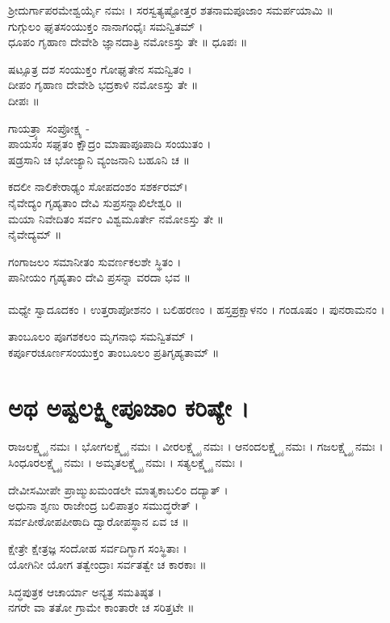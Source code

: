  ಶ್ರೀದುರ್ಗಾಪರಮೇಶ್ವರ್ಯೈ ನಮಃ ।  ಸರಸ್ವತ್ಯಷ್ಟೋತ್ತರ ಶತನಾಮಪೂಜಾಂ ಸಮರ್ಪಯಾಮಿ ॥\\

ಗುಗ್ಗುಲಂ ಘೃತಸಂಯುಕ್ತಂ ನಾನಾಗಂಧೈಃ ಸಮನ್ವಿತಮ್ ।\\
ಧೂಪಂ ಗೃಹಾಣ ದೇವೇಶಿ ಜ್ಞಾನದಾತ್ರಿ ನಮೋಽಸ್ತು ತೇ ॥
 ಧೂಪಃ ॥

ಷಟ್ಸೂತ್ರ ದಶ ಸಂಯುಕ್ತಂ ಗೋಘೃತೇನ ಸಮನ್ವಿತಂ ।\\
ದೀಪಂ ಗೃಹಾಣ ದೇವೇಶಿ ಭದ್ರಕಾಳಿ ನಮೋಽಸ್ತು ತೇ ॥\\
ದೀಪಃ ॥

ಗಾಯತ್ರ್ಯಾ ಸಂಪ್ರೋಕ್ಷ್ಯ -\\
ಪಾಯಸಂ ಸಘೃತಂ ಕ್ಷೌದ್ರಂ ಮಾಷಾಪೂಪಾದಿ ಸಂಯುತಂ ।\\
ಷಡ್ರಸಾನಿ ಚ ಭೋಜ್ಯಾನಿ ವ್ಯಂಜನಾನಿ ಬಹೂನಿ ಚ ॥

ಕದಲೀ ನಾಲಿಕೇರಾಢ್ಯಂ ಸೋಪದಂಶಂ ಸಶರ್ಕರಮ್।\\
ನೈವೇದ್ಯಂ ಗೃಹ್ಯತಾಂ ದೇವಿ ಸುಪ್ರಸನ್ನಾಖಿಲೇಶ್ವರಿ ॥\\
ಮಯಾ ನಿವೇದಿತಂ ಸರ್ವಂ ವಿಶ್ವಮೂರ್ತೇ ನಮೋಽಸ್ತು ತೇ ॥\\
 ನೈವೇದ್ಯಮ್ ॥

ಗಂಗಾಜಲಂ ಸಮಾನೀತಂ ಸುವರ್ಣಕಲಶೇ ಸ್ಥಿತಂ ।\\
ಪಾನೀಯಂ ಗೃಹ್ಯತಾಂ ದೇವಿ ಪ್ರಸನ್ನಾ ವರದಾ ಭವ ॥\\
\\
ಮಧ್ಯೇ ಸ್ವಾದೂದಕಂ । ಉತ್ತರಾಪೋಶನಂ । ಬಲಿಹರಣಂ । ಹಸ್ತಪ್ರಕ್ಷಾಳನಂ । ಗಂಡೂಷಂ । ಪುನರಾಮನಂ ।

ತಾಂಬೂಲಂ ಪೂಗಶಕಲಂ ಮೃಗನಾಭಿ ಸಮನ್ವಿತಮ್ ।\\
ಕರ್ಪೂರಚೂರ್ಣಸಂಯುಕ್ತಂ ತಾಂಬೂಲಂ ಪ್ರತಿಗೃಹ್ಯತಾಮ್ ॥

\section{ಅಥ ಅಷ್ಟಲಕ್ಷ್ಮೀಪೂಜಾಂ ಕರಿಷ್ಯೇ ।}
ರಾಜಲಕ್ಷ್ಮ್ಯೈ ನಮಃ । ಭೋಗಲಕ್ಷ್ಮ್ಯೈ ನಮಃ । ವೀರಲಕ್ಷ್ಮ್ಯೈ ನಮಃ । ಆನಂದಲಕ್ಷ್ಮ್ಯೈ ನಮಃ । ಗಜಲಕ್ಷ್ಮ್ಯೈ ನಮಃ । ಸಿಂಧೂರಲಕ್ಷ್ಮ್ಯೈ ನಮಃ । ಅಮೃತಲಕ್ಷ್ಮ್ಯೈ ನಮಃ । ಸತ್ಯಲಕ್ಷ್ಮ್ಯೈ ನಮಃ ।

ದೇವೀಸಮೀಪೇ ಪ್ರಾಙ್ಮುಖಮಂಡಲೇ ಮಾತೃಕಾಬಲಿಂ ದದ್ಯಾತ್ ।\\
ಅಧುನಾ ಶೃಣು ರಾಜೇಂದ್ರ ಬಲಿಪಾತ್ರಂ ಸಮುದ್ಧರೇತ್ ।\\
ಸರ್ವಪೀಠೋಪಪೀಠಾದಿ ದ್ವಾರೋಪಸ್ಥಾನ ಏವ ಚ ॥

ಕ್ಷೇತ್ರೇ ಕ್ಷೇತ್ರಜ್ಞ ಸಂದೋಹ ಸರ್ವದಿಗ್ಭಾಗ ಸಂಸ್ಥಿತಾಃ ।\\
ಯೋಗಿನೀ ಯೋಗ ತತ್ವೇಂದ್ರಾಃ ಸರ್ವತತ್ವೇ ಚ ಕಾರಕಾಃ ॥

ಸಿದ್ಧಪುತ್ರಕ ಆಚಾರ್ಯಾ ಅನ್ಯತ್ರ ಸಮತಿಷ್ಠತ ।\\
ನಗರೇ ವಾ ತತೋ ಗ್ರಾಮೇ ಕಾಂತಾರೇ ಚ ಸರಿತ್ತಟೇ ॥

